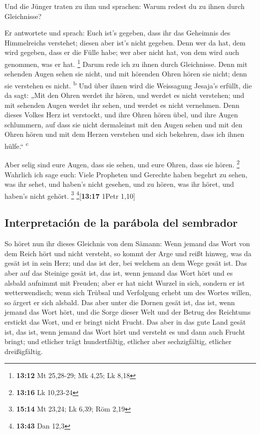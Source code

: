  Und die Jünger traten zu ihm und sprachen: Warum redest
du zu ihnen durch Gleichnisse?

 Er antwortete und sprach: Euch ist's gegeben, dass ihr
das Geheimnis des Himmelreichs verstehet; diesen aber ist's nicht
gegeben.  Denn wer da hat, dem wird gegeben, dass er die
Fülle habe; wer aber nicht hat, von dem wird auch genommen, was er hat.
\footnote{\textbf{13:12} Mt 25,28-29; Mk 4,25; Lk 8,18} 
Darum rede ich zu ihnen durch Gleichnisse. Denn mit sehenden Augen sehen
sie nicht, und mit hörenden Ohren hören sie nicht; denn sie verstehen es
nicht. \textsuperscript{b}  Und über ihnen wird die
Weissagung Jesaja's erfüllt, die da sagt: „Mit den Ohren werdet ihr
hören, und werdet es nicht verstehen; und mit sehenden Augen werdet ihr
sehen, und werdet es nicht vernehmen.  Denn dieses Volkes
Herz ist verstockt, und ihre Ohren hören übel, und ihre Augen
schlummern, auf dass sie nicht dermaleinst mit den Augen sehen und mit
den Ohren hören und mit dem Herzen verstehen und sich bekehren, dass ich
ihnen hülfe.`` \textsuperscript{c}

 Aber selig sind eure Augen, dass sie sehen, und eure
Ohren, dass sie hören. \footnote{\textbf{13:16} Lk 10,23-24}
 Wahrlich ich sage euch: Viele Propheten und Gerechte
haben begehrt zu sehen, was ihr sehet, und haben's nicht gesehen, und zu
hören, was ihr höret, und haben's nicht gehört. \footnote{\textbf{15:14}
  Mt 23,24; Lk 6,39; Röm 2,19} \footnote{\textbf{13:43} Dan 12,3}{[}\textbf{13:17}
1Petr 1,10{]}

\hypertarget{interpretaciuxf3n-de-la-paruxe1bola-del-sembrador}{%
\subsection{Interpretación de la parábola del
sembrador}\label{interpretaciuxf3n-de-la-paruxe1bola-del-sembrador}}

 So höret nun ihr dieses Gleichnis von dem Sämann:
 Wenn jemand das Wort von dem Reich hört und nicht
versteht, so kommt der Arge und reißt hinweg, was da gesät ist in sein
Herz; und das ist der, bei welchem an dem Wege gesät ist.
 Das aber auf das Steinige gesät ist, das ist, wenn
jemand das Wort hört und es alsbald aufnimmt mit Freuden;
 aber er hat nicht Wurzel in sich, sondern er ist
wetterwendisch; wenn sich Trübsal und Verfolgung erhebt um des Wortes
willen, so ärgert er sich alsbald.  Das aber unter die
Dornen gesät ist, das ist, wenn jemand das Wort hört, und die Sorge
dieser Welt und der Betrug des Reichtums erstickt das Wort, und er
bringt nicht Frucht.  Das aber in das gute Land gesät
ist, das ist, wenn jemand das Wort hört und versteht es und dann auch
Frucht bringt; und etlicher trägt hundertfältig, etlicher aber
sechzigfältig, etlicher dreißigfältig.

